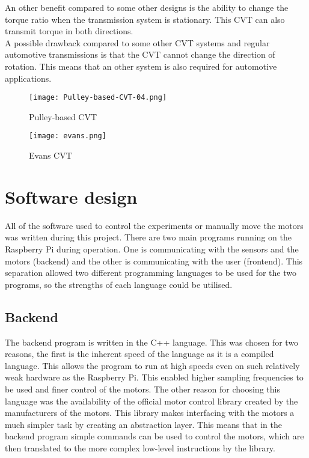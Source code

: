 \documentclass[12pt]{article}
\begin{document}
An other benefit compared to some other designs is the ability to change the torque ratio when the transmission system is stationary. This CVT can also transmit torque in both directions. \\

A possible drawback compared to some other CVT systems and regular automotive transmissions is that the CVT cannot change the direction of rotation. This means that an other system is also required for automotive applications.

\begin{figure}
    \centering
    \begin{minipage}{0.49\textwidth}
        \texttt{[image: Pulley-based-CVT-04.png]}
        \caption{Pulley-based CVT \cite{pulleyCVT}}
        \label{fig:pulleyCVT}
    \end{minipage}
    \begin{minipage}{0.49\textwidth}
        \texttt{[image: evans.png]}
        \caption{Evans CVT \cite{evans}}
        \label{fig:evans}
    \end{minipage} 


\end{figure}


\pagebreak
\section{Software design}
All of the software used to control the experiments or manually move the motors was written during this project. There are two main programs running on the Raspberry Pi during operation. One is communicating with the sensors and the motors (backend) and the other is communicating with the user (frontend). This separation allowed two different programming languages to be used for the two programs, so the strengths of each language could be utilised.

\subsection{Backend}
The backend program is written in the C++ language. This was chosen for two reasons, the first is the inherent speed of the language as it is a compiled language. This allows the program to run at high speeds even on such relatively weak hardware as the Raspberry Pi. This enabled higher sampling frequencies to be used and finer control of the motors. The other reason for choosing this language was the availability of the official motor control library created by the manufacturers of the motors. This library makes interfacing with the motors a much simpler task by creating an abstraction layer. This means that in the backend program simple commands can be used to control the motors, which are then translated to the more complex low-level instructions by the library.\\
\end{document}
